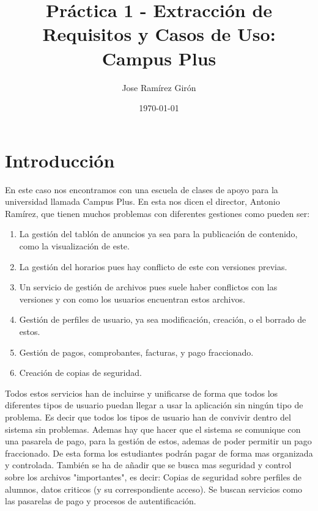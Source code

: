 \documentclass[11pt, a4paper]{article} %
\title{Práctica 1 - Extracción de Requisitos y Casos de Uso: Campus Plus}
\author{Jose Ramírez Girón}
\date{\today}
\begin{document}
\maketitle

\newpage

\tableofcontents

\newpage

\section{Introducción}
	En este caso nos encontramos con una escuela de clases de apoyo para la universidad llamada Campus Plus.
	En esta nos dicen el director, Antonio Ramírez, que tienen muchos problemas con diferentes gestiones como
	pueden ser:
	\begin{enumerate}
		\item La gestión del tablón de anuncios ya sea para la publicación de contenido, como la visualización de este.
		\item La gestión del horarios pues hay conflicto de este con versiones previas.
		\item Un servicio de gestión de archivos pues suele haber conflictos con las versiones y con como los usuarios encuentran estos archivos.
		\item Gestión de perfiles de usuario, ya sea modificación, creación, o el borrado de estos.
		\item Gestión de pagos, comprobantes, facturas, y pago fraccionado.
		\item Creación de copias de seguridad.
	\end{enumerate}

	Todos estos servicios han de incluirse y unificarse de forma que todos los diferentes tipos de usuario puedan
	llegar a usar la aplicación sin ningún tipo de problema. Es decir que todos los tipos de usuario han de convivir
	dentro del sistema sin problemas. \newline
	Ademas hay que hacer que el sistema se comunique con una pasarela de pago, para la gestión de estos, ademas de poder
	permitir un pago fraccionado. De esta forma los estudiantes podrán pagar de forma mas organizada y controlada.\newline
	También se ha de añadir que se busca mas seguridad y control sobre los archivos "importantes", es decir: Copias de seguridad
	sobre perfiles de alumnos, datos criticos (y su correspondiente acceso). Se buscan servicios como las pasarelas de pago y
	procesos de autentificación.
\end{document}
